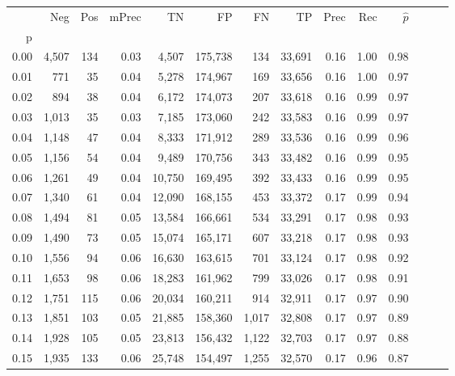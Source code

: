 \begin{tabular}{rrrrrrrrrrrrrr}
\toprule
{} &    Neg &  Pos & mPrec &       TN &       FP &      FN &      TP &  Prec &   Rec & $\hat{p}$ \\
p    &        &      &       &          &          &         &         &       &       &           \\
\midrule
0.00 &  4,507 &  134 &  0.03 &    4,507 &  175,738 &     134 &  33,691 &  0.16 &  1.00 &      0.98 \\
0.01 &    771 &   35 &  0.04 &    5,278 &  174,967 &     169 &  33,656 &  0.16 &  1.00 &      0.97 \\
0.02 &    894 &   38 &  0.04 &    6,172 &  174,073 &     207 &  33,618 &  0.16 &  0.99 &      0.97 \\
0.03 &  1,013 &   35 &  0.03 &    7,185 &  173,060 &     242 &  33,583 &  0.16 &  0.99 &      0.97 \\
0.04 &  1,148 &   47 &  0.04 &    8,333 &  171,912 &     289 &  33,536 &  0.16 &  0.99 &      0.96 \\
0.05 &  1,156 &   54 &  0.04 &    9,489 &  170,756 &     343 &  33,482 &  0.16 &  0.99 &      0.95 \\
0.06 &  1,261 &   49 &  0.04 &   10,750 &  169,495 &     392 &  33,433 &  0.16 &  0.99 &      0.95 \\
0.07 &  1,340 &   61 &  0.04 &   12,090 &  168,155 &     453 &  33,372 &  0.17 &  0.99 &      0.94 \\
0.08 &  1,494 &   81 &  0.05 &   13,584 &  166,661 &     534 &  33,291 &  0.17 &  0.98 &      0.93 \\
0.09 &  1,490 &   73 &  0.05 &   15,074 &  165,171 &     607 &  33,218 &  0.17 &  0.98 &      0.93 \\
0.10 &  1,556 &   94 &  0.06 &   16,630 &  163,615 &     701 &  33,124 &  0.17 &  0.98 &      0.92 \\
0.11 &  1,653 &   98 &  0.06 &   18,283 &  161,962 &     799 &  33,026 &  0.17 &  0.98 &      0.91 \\
0.12 &  1,751 &  115 &  0.06 &   20,034 &  160,211 &     914 &  32,911 &  0.17 &  0.97 &      0.90 \\
0.13 &  1,851 &  103 &  0.05 &   21,885 &  158,360 &   1,017 &  32,808 &  0.17 &  0.97 &      0.89 \\
0.14 &  1,928 &  105 &  0.05 &   23,813 &  156,432 &   1,122 &  32,703 &  0.17 &  0.97 &      0.88 \\
0.15 &  1,935 &  133 &  0.06 &   25,748 &  154,497 &   1,255 &  32,570 &  0.17 &  0.96 &      0.87 \\

\end{tabular}
